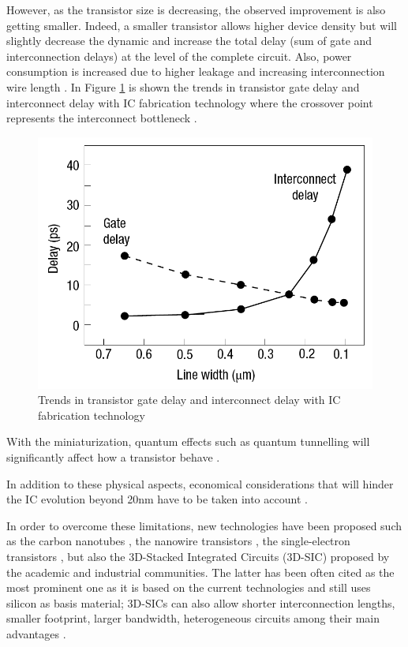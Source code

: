 However, as the transistor size is decreasing, the observed improvement is also getting smaller. Indeed, a smaller transistor allows higher device density but will slightly decrease the dynamic and increase the total delay (sum of gate and interconnection delays) at the level of the complete circuit. Also, power consumption is increased due to higher leakage and increasing interconnection wire length \cite{5227192}. In Figure \ref{fig:delaygateinterconnect} is shown the trends in transistor gate delay and interconnect delay with IC fabrication technology where the crossover point represents the interconnect bottleneck \cite{kirchain2007}.

\begin{figure}
\begin{center}
\includegraphics[width=0.75\linewidth]{delaygateinterconnect}
\end{center}
\caption{Trends in transistor gate delay and interconnect delay with IC fabrication technology \cite{kirchain2007}}
\label{fig:delaygateinterconnect}
\end{figure}

With the miniaturization, quantum effects such as quantum tunnelling will significantly affect how a transistor behave \cite{1240081}.

In addition to these physical aspects, economical considerations that will hinder the IC evolution beyond 20nm have to be taken into account \cite{5227192,PFF10}.

In order to overcome these limitations, new technologies have been proposed such as the carbon nanotubes \cite{tans1998room}, the nanowire transistors \cite{doi:10.1021/nl025875l}, the single-electron transistors \cite{citeulike:4194929}, but also the 3D-Stacked Integrated Circuits (3D-SIC) proposed by the academic and industrial communities. The latter has been often cited as the most prominent one as it is based on the current technologies and still uses silicon as basis material; 3D-SICs can also allow shorter interconnection lengths, smaller footprint, larger bandwidth, heterogeneous circuits among their main advantages \cite{659500,1652906,981091,4299568}.

